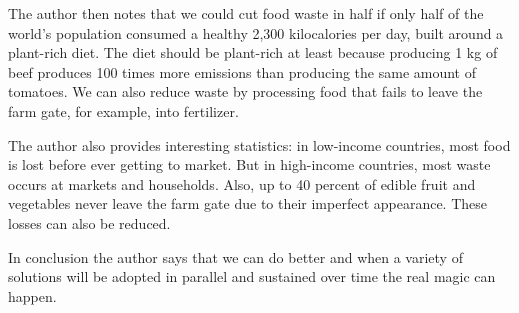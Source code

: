 \documentclass[a4paper]{article}
\begin{document}
The author then notes that we could cut food waste in half if only half of the world's population consumed a healthy 2,300 kilocalories per day, built around a plant-rich diet. The diet should be plant-rich at least because producing 1 kg of beef produces 100 times more emissions than producing the same amount of tomatoes. We can also reduce waste by processing food that fails to leave the farm gate, for example, into fertilizer.

The author also provides interesting statistics: in low-income countries, most food is lost before ever getting to market. But in high-income countries, most waste occurs at markets and households. Also, up to 40 percent of edible fruit and vegetables never leave the farm gate due to their imperfect appearance. These losses can also be reduced.

In conclusion the author says that we can do better and when a variety of solutions will be adopted in parallel and sustained over time the real magic can happen.
\end{document}
